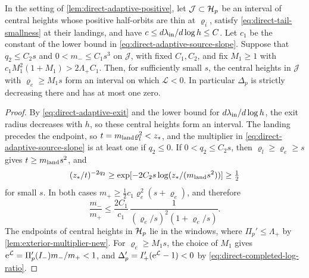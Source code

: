 \begin{corollary}
\label{cor:large-exit-contraction}
In the setting of \cref{lem:direct-adaptive-positive}, let
\(\mathcal J\subset\mathcal H_p\) be an interval of central heights whose positive
half-orbits are thin at \(\varrho_i\), satisfy
\eqref{eq:direct-tail-smallness} at their landings, and have
\(c\le d\lambda_{\rm in}/d\log h\le C\). Let \(c_1\) be the constant of the
lower bound in \eqref{eq:direct-adaptive-source-slope}. Suppose that
\(q_2\le C_2s\) and \(0<m_-\le C_1s^3\) on \(\mathcal J\), with fixed
\(C_1,C_2\), and fix \(M_1\ge1\) with
\(c_1M_1^2(1+M_1)>2\Lambda_+C_1\). Then, for sufficiently small \(s\),
the central heights in \(\mathcal J\) with \(\varrho_e\ge M_1s\) form an
interval on which \(\mathcal L<0\). In particular \(\Delta_p\) is strictly
decreasing there and has at most one zero.
\end{corollary}

\begin{proof}
By \eqref{eq:direct-adaptive-exit} and the lower bound for
\(d\lambda_{\rm in}/d\log h\), the exit radius decreases with \(h\), so
these central heights form an interval. The landing precedes the
endpoint, so \(t=m_{\rm land}\varrho_l^2<z_*\), and the multiplier in
\eqref{eq:direct-adaptive-source-slope} is at least one if \(q_2\le0\).
If \(0<q_2\le C_2s\), then \(\varrho_l\ge\varrho_e\ge s\) gives
\(t\ge m_{\rm land}s^2\), and
\[
 (z_*/t)^{-2q_2}\ge\exp[-2C_2s\log(z_*/(m_{\rm land}s^2))]\ge\tfrac12
\]
for small \(s\). In both cases
\(m_+\ge\frac12c_1\varrho_e^2(s+\varrho_e)\), and therefore
\[
 \frac{m_-}{m_+}\le\frac{2C_1}{c_1}\,
        \frac1{(\varrho_e/s)^2(1+\varrho_e/s)} .
\]
The endpoints of central heights in \(\mathcal H_p\) lie in the windows, where
\(\Pi_p'\le\Lambda_+\) by \cref{lem:exterior-multiplier-new}. For
\(\varrho_e\ge M_1s\), the choice of \(M_1\) gives
\(\mathrm e^{\mathcal L}=\Pi_p'(I_-)m_-/m_+<1\), and
\(\Delta_p'=I_+'(\mathrm e^{\mathcal L}-1)<0\) by
\eqref{eq:direct-completed-log-ratio}.
\end{proof}
